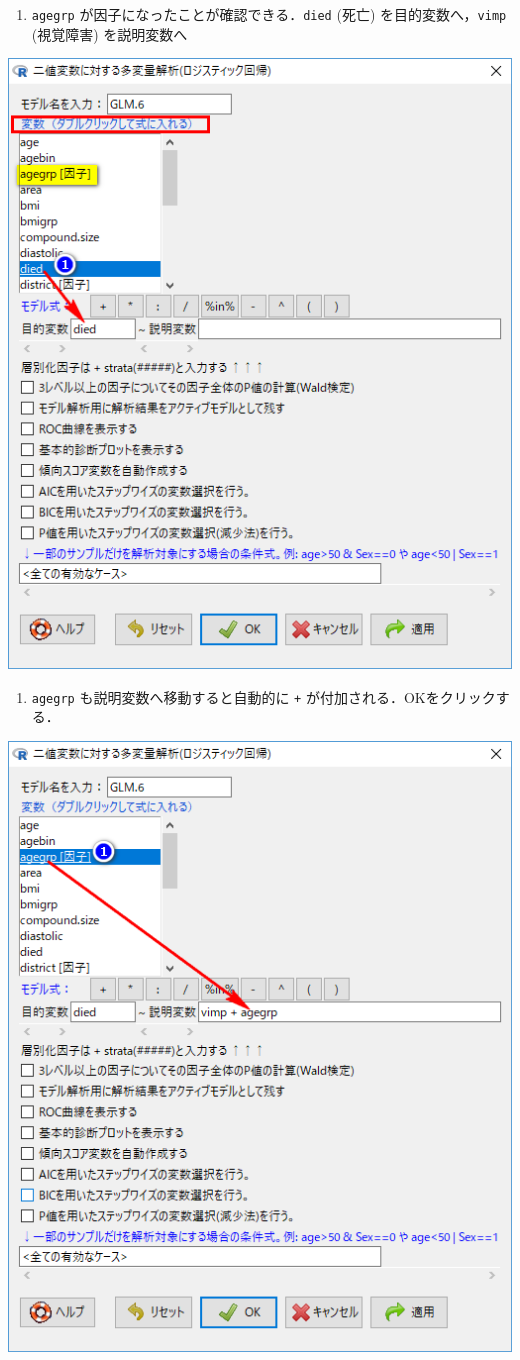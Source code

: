 \documentclass[11pt,]{problemset}
\providecommand{\tightlist}{%
  \setlength{\itemsep}{0pt}\setlength{\parskip}{0pt}}
\begin{document}
\begin{enumerate}
\def\labelenumi{\arabic{enumi}.}
\setcounter{enumi}{1}
\tightlist
\item
  \texttt{agegrp} が因子になったことが確認できる．\newline \texttt{died}
  (死亡) を目的変数へ，\texttt{vimp} (視覚障害) を説明変数へ
\end{enumerate}

\begin{center}\includegraphics[width=0.5\linewidth,height=0.5\textheight]{pic/mltlogstic05} \end{center}

\begin{enumerate}
\def\labelenumi{\arabic{enumi}.}
\setcounter{enumi}{2}
\tightlist
\item
  \texttt{agegrp} も説明変数へ移動すると自動的に \texttt{+}
  が付加される．OKをクリックする．
\end{enumerate}

\begin{center}\includegraphics[width=0.5\linewidth,height=0.5\textheight]{pic/mltlogstic06} \end{center}
\end{document}
